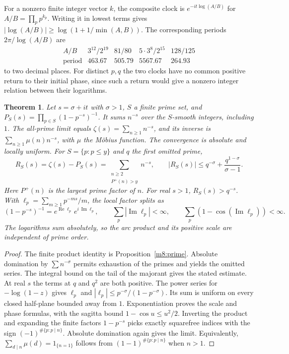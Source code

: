 \documentclass[11pt,reqno]{amsart}
\newtheorem{theorem}{Theorem}[section]
\theoremstyle{definition}
\theoremstyle{remark}
\numberwithin{equation}{section}
\newcommand{\re}{\operatorname{Re}}
\begin{document}
For a nonzero finite integer vector \(k\), the composite clock
is \(e^{-it\log(A/B)}\) for \(A/B=\prod_p p^{k_p}\).
Writing it in lowest terms gives
\(|\log(A/B)|\ge\log(1+1/\min(A,B))\).
The corresponding periods \(2\pi/\log(A/B)\) are
\[
\begin{array}{c|rrrr}
 A/B & 3^{12}/2^{19} & 81/80 & 5\cdot3^8/2^{15} & 128/125\\
 \text{period} & 463.67 & 505.79 & 5567.67 & 264.93
\end{array}
\]
to two decimal places. For distinct \(p,q\) the two clocks have no common
positive return to their initial phase, since such a return would
give a nonzero integer relation between their logarithms.

\begin{theorem}\label{m9:euler}
Let \(s=\sigma+it\) with \(\sigma>1\), \(S\) a finite prime set,
and \(P_S(s)=\prod_{p\in S}(1-p^{-s})^{-1}\).
It sums \(n^{-s}\) over the \(S\)-smooth integers, including \(1\).
The all-prime limit equals \(\zeta(s)=\sum_{n\ge1} n^{-s}\), and
its inverse is \(\sum_{n\ge1}\mu(n)n^{-s}\), with \(\mu\) the
M\"obius function. The convergence is absolute and locally uniform.
For \(S=\{p:p\le y\}\) and \(q\) the first omitted prime,
\[
 R_S(s)=\zeta(s)-P_S(s)=
  \sum_{\substack{n\ge2\\P^+(n)>y}} n^{-s},\qquad
 |R_S(s)|\le q^{-\sigma}+\frac{q^{1-\sigma}}{\sigma-1}.
\]
Here \(P^+(n)\) is the largest prime factor of \(n\).
For real \(s>1\), \(R_S(s)>q^{-s}\).
With \(\ell_p=\sum_{m\ge1}p^{-ms}/m\), the local factor splits as
\[
 (1-p^{-s})^{-1}=e^{\re\ell_p}\,e^{i\,\operatorname{Im}\ell_p},
 \qquad
 \sum_p|\operatorname{Im}\ell_p|<\infty,\qquad
 \sum_p(1-\cos(\operatorname{Im}\ell_p))<\infty .
\]
The logarithms sum absolutely, so the arc product and its positive
scale are independent of prime order.
\end{theorem}


\begin{proof}
The finite product identity is Proposition~\ref{m8:prime}. Absolute
domination by \(\sum n^{-\sigma}\) permits exhaustion of the
primes and yields the omitted series. The integral bound on
the tail of the majorant gives the stated estimate. At real \(s\)
the terms at \(q\) and \(q^2\) are both positive.
The power series for \(-\log(1-z)\) gives \(\ell_p\) and
\(|\ell_p|\le p^{-\sigma}/(1-p^{-\sigma})\). Its sum is
uniform on every closed half-plane bounded away from \(1\).
Exponentiation proves the scale and phase formulas, with the
sagitta bound \(1-\cos u\le u^2/2\). Inverting the product
and expanding the finite factors \(1-p^{-s}\) picks exactly
squarefree indices with the sign \((-1)^{\#\{p:p\mid n\}}\).
Absolute domination again gives the limit. Equivalently,
\(\sum_{d\mid n}\mu(d)=1_{\{n=1\}}\) follows from
\((1-1)^{\#\{p:p\mid n\}}\) when \(n>1\).
\end{proof}
\end{document}
